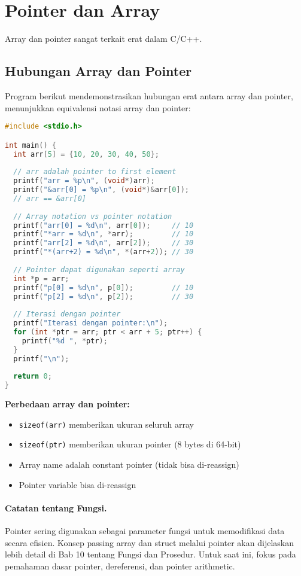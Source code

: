 \documentclass[../main.tex]{subfiles}
\begin{document}
\section{Pointer dan Array}

Array dan pointer sangat terkait erat dalam C/C++.

\subsection{Hubungan Array dan Pointer}

Program berikut mendemonstrasikan hubungan erat antara array dan pointer, menunjukkan equivalensi notasi array dan pointer:

\begin{lstlisting}[language=C, caption={Array dan pointer di C}]
#include <stdio.h>

int main() {
  int arr[5] = {10, 20, 30, 40, 50};
  
  // arr adalah pointer to first element
  printf("arr = %p\n", (void*)arr);
  printf("&arr[0] = %p\n", (void*)&arr[0]);
  // arr == &arr[0]
  
  // Array notation vs pointer notation
  printf("arr[0] = %d\n", arr[0]);     // 10
  printf("*arr = %d\n", *arr);         // 10
  printf("arr[2] = %d\n", arr[2]);     // 30
  printf("*(arr+2) = %d\n", *(arr+2)); // 30
  
  // Pointer dapat digunakan seperti array
  int *p = arr;
  printf("p[0] = %d\n", p[0]);         // 10
  printf("p[2] = %d\n", p[2]);         // 30
  
  // Iterasi dengan pointer
  printf("Iterasi dengan pointer:\n");
  for (int *ptr = arr; ptr < arr + 5; ptr++) {
    printf("%d ", *ptr);
  }
  printf("\n");
  
  return 0;
}
\end{lstlisting}

\textbf{Perbedaan array dan pointer:}
\begin{itemize}
  \item \texttt{sizeof(arr)} memberikan ukuran seluruh array
  \item \texttt{sizeof(ptr)} memberikan ukuran pointer (8 bytes di 64-bit)
  \item Array name adalah constant pointer (tidak bisa di-reassign)
  \item Pointer variable bisa di-reassign
\end{itemize}

\paragraph{Catatan tentang Fungsi.} Pointer sering digunakan sebagai parameter fungsi untuk memodifikasi data secara efisien. Konsep passing array dan struct melalui pointer akan dijelaskan lebih detail di Bab 10 tentang Fungsi dan Prosedur. Untuk saat ini, fokus pada pemahaman dasar pointer, dereferensi, dan pointer arithmetic.
\end{document}

